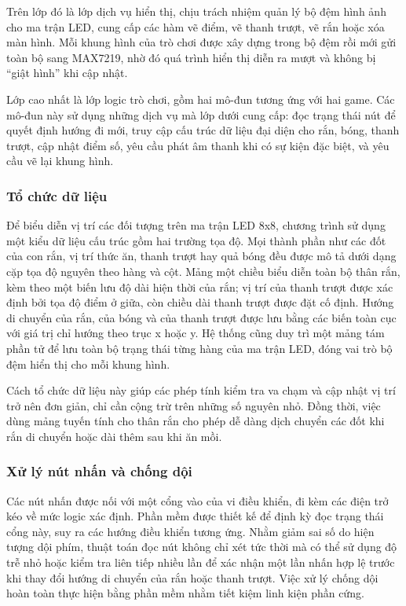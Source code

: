 Trên lớp đó là lớp dịch vụ hiển thị, chịu trách nhiệm quản lý bộ đệm hình ảnh cho ma trận LED, cung cấp các hàm vẽ điểm, vẽ thanh trượt, vẽ rắn hoặc xóa màn hình. Mỗi khung hình của trò chơi được xây dựng trong bộ đệm rồi mới gửi toàn bộ sang MAX7219, nhờ đó quá trình hiển thị diễn ra mượt và không bị “giật hình” khi cập nhật.

Lớp cao nhất là lớp logic trò chơi, gồm hai mô-đun tương ứng với hai game. Các mô-đun này sử dụng những dịch vụ mà lớp dưới cung cấp: đọc trạng thái nút để quyết định hướng đi mới, truy cập cấu trúc dữ liệu đại diện cho rắn, bóng, thanh trượt, cập nhật điểm số, yêu cầu phát âm thanh khi có sự kiện đặc biệt, và yêu cầu vẽ lại khung hình.
\subsubsection{Tổ chức dữ liệu}
Để biểu diễn vị trí các đối tượng trên ma trận LED 8x8, chương trình sử dụng một kiểu dữ liệu cấu trúc gồm hai trường tọa độ. Mọi thành phần như các đốt của con rắn, vị trí thức ăn, thanh trượt hay quả bóng đều được mô tả dưới dạng cặp tọa độ nguyên theo hàng và cột. Mảng một chiều biểu diễn toàn bộ thân rắn, kèm theo một biến lưu độ dài hiện thời của rắn; vị trí của thanh trượt được xác định bởi tọa độ điểm ở giữa, còn chiều dài thanh trượt được đặt cố định. Hướng di chuyển của rắn, của bóng và của thanh trượt được lưu bằng các biến toàn cục với giá trị chỉ hướng theo trục x hoặc y. Hệ thống cũng duy trì một mảng tám phần tử để lưu toàn bộ trạng thái từng hàng của ma trận LED, đóng vai trò bộ đệm hiển thị cho mỗi khung hình. 

Cách tổ chức dữ liệu này giúp các phép tính kiểm tra va chạm và cập nhật vị trí trở nên đơn giản, chỉ cần cộng trừ trên những số nguyên nhỏ. Đồng thời, việc dùng mảng tuyến tính cho thân rắn cho phép dễ dàng dịch chuyển các đốt khi rắn di chuyển hoặc dài thêm sau khi ăn mồi.
\subsubsection{Xử lý nút nhấn và chống dội}
Các nút nhấn được nối với một cổng vào của vi điều khiển, đi kèm các điện trở kéo về mức logic xác định. Phần mềm được thiết kế để định kỳ đọc trạng thái cổng này, suy ra các hướng điều khiển tương ứng. Nhằm giảm sai số do hiện tượng dội phím, thuật toán đọc nút không chỉ xét tức thời mà có thể sử dụng độ trễ nhỏ hoặc kiểm tra liên tiếp nhiều lần để xác nhận một lần nhấn hợp lệ trước khi thay đổi hướng di chuyển của rắn hoặc thanh trượt. Việc xử lý chống dội hoàn toàn thực hiện bằng phần mềm nhằm tiết kiệm linh kiện phần cứng.
